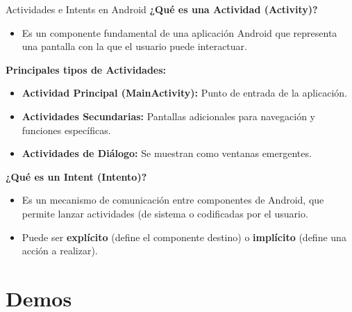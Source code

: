 \documentclass[aspectratio=169,compress]{beamer}
\begin{document}
\begin{frame}{Actividades e Intents en Android}
\textbf{¿Qué es una Actividad (Activity)?}

\begin{itemize}
    \item Es un componente fundamental de una aplicación Android que representa una pantalla con la que el usuario puede interactuar.
\end{itemize}

\vspace{0.4cm}

\textbf{Principales tipos de Actividades:}
\begin{itemize}
    \item \textbf{Actividad Principal (MainActivity):} Punto de entrada de la aplicación.
    \item \textbf{Actividades Secundarias:} Pantallas adicionales para navegación y funciones específicas.
    \item \textbf{Actividades de Diálogo:} Se muestran como ventanas emergentes.
\end{itemize}

\vspace{0.4cm}

\textbf{¿Qué es un Intent (Intento)?}
\begin{itemize}
    \item Es un mecanismo de comunicación entre componentes de Android, que permite lanzar actividades (de sistema o codificadas por el usuario.
    \item Puede ser \textbf{explícito} (define el componente destino) o \textbf{implícito} (define una acción a realizar).
\end{itemize}

\end{frame}




\section{Demos}










\end{document}
